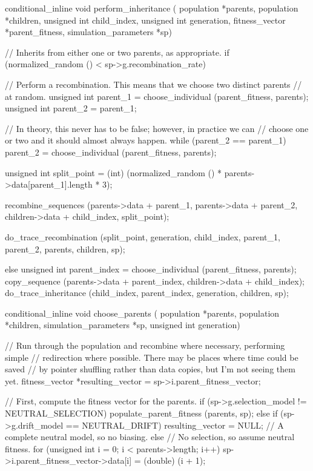 \documentclass{article}
\begin{document}
\begin{ccode}
conditional_inline void perform_inheritance (
    population *parents, population *children,
    unsigned int child_index, unsigned int generation,
    fitness_vector *parent_fitness, simulation_parameters *sp) {

  // Inherits from either one or two parents, as appropriate.
  if (normalized_random () < sp->g.recombination_rate) {
    // Perform a recombination. This means that we choose two distinct parents
    // at random.
    unsigned int parent_1 = choose_individual (parent_fitness, parents);
    unsigned int parent_2 = parent_1;

    // In theory, this never has to be false; however, in practice we can
    // choose one or two and it should almost always happen.
    while (parent_2 == parent_1)
      parent_2 = choose_individual (parent_fitness, parents);

    unsigned int split_point = (int)
      (normalized_random () * parents->data[parent_1].length * 3);

    recombine_sequences (parents->data + parent_1,
			 parents->data + parent_2,
			 children->data + child_index,
			 split_point);

    do_trace_recombination (split_point, generation, child_index, parent_1,
			    parent_2, parents, children, sp);
  } else {
    unsigned int parent_index = choose_individual (parent_fitness, parents);
    copy_sequence (parents->data + parent_index, children->data + child_index);
    do_trace_inheritance (child_index, parent_index, generation, children, sp);
  }
}

conditional_inline void choose_parents (
    population *parents, population *children,
    simulation_parameters *sp, unsigned int generation) {

  // Run through the population and recombine where necessary, performing simple
  // redirection where possible. There may be places where time could be saved
  // by pointer shuffling rather than data copies, but I'm not seeing them yet.
  fitness_vector *resulting_vector = sp->i.parent_fitness_vector;

  // First, compute the fitness vector for the parents.
  if (sp->g.selection_model != NEUTRAL_SELECTION)
    populate_parent_fitness (parents, sp);
  else if (sp->g.drift_model == NEUTRAL_DRIFT)
    resulting_vector = NULL; // A complete neutral model, so no biasing.
  else
    // No selection, so assume neutral fitness.
    for (unsigned int i = 0; i < parents->length; i++)
      sp->i.parent_fitness_vector->data[i] = (double) (i + 1);

}
\end{ccode}
\end{document}
